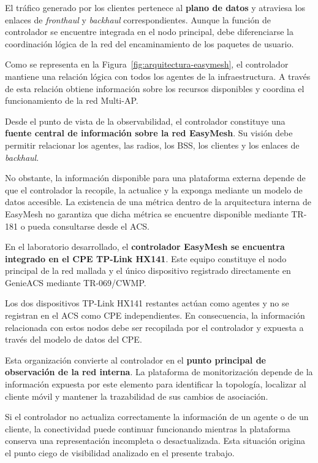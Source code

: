El tráfico generado por los clientes pertenece al
\textbf{plano de datos} y atraviesa los enlaces de
\textit{fronthaul} y \textit{backhaul} correspondientes. Aunque la
función de controlador se encuentre integrada en el nodo principal, debe
diferenciarse la coordinación lógica de la red del encaminamiento de los
paquetes de usuario.

Como se representa en la
Figura~\ref{fig:arquitectura-easymesh}, el controlador mantiene una
relación lógica con todos los agentes de la infraestructura. A través de
esta relación obtiene información sobre los recursos disponibles y
coordina el funcionamiento de la red Multi-AP.

Desde el punto de vista de la observabilidad, el controlador constituye
una \textbf{fuente central de información sobre la red EasyMesh}. Su
visión debe permitir relacionar los agentes, las radios, los BSS, los
clientes y los enlaces de \textit{backhaul}.

No obstante, la información disponible para una plataforma externa
depende de que el controlador la recopile, la actualice y la exponga
mediante un modelo de datos accesible. La existencia de una métrica dentro
de la arquitectura interna de EasyMesh no garantiza que dicha métrica se
encuentre disponible mediante TR-181 o pueda consultarse desde el ACS.

En el laboratorio desarrollado, el
\textbf{controlador EasyMesh se encuentra integrado en el CPE TP-Link
HX141}. Este equipo constituye el nodo principal de la red mallada y el
único dispositivo registrado directamente en GenieACS mediante
TR-069/CWMP.

Los dos dispositivos TP-Link HX141 restantes actúan como agentes y no se
registran en el ACS como CPE independientes. En consecuencia, la
información relacionada con estos nodos debe ser recopilada por el
controlador y expuesta a través del modelo de datos del CPE.

Esta organización convierte al controlador en el
\textbf{punto principal de observación de la red interna}. La plataforma
de monitorización depende de la información expuesta por este elemento
para identificar la topología, localizar al cliente móvil y mantener la
trazabilidad de sus cambios de asociación.

Si el controlador no actualiza correctamente la información de un agente
o de un cliente, la conectividad puede continuar funcionando mientras la
plataforma conserva una representación incompleta o desactualizada. Esta
situación origina el punto ciego de visibilidad analizado en el presente
trabajo.

